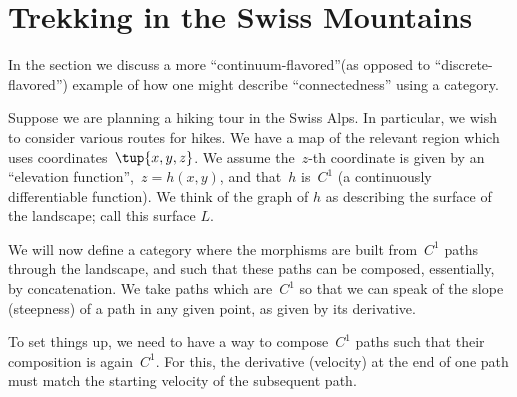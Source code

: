 
\section{Trekking in the Swiss Mountains}
\label{sec:trekking}

In the section we discuss a more ``continuum-flavored''(as opposed to ``discrete-flavored'') example of how one might describe ``connectedness'' using a category.

Suppose we are planning a hiking tour in the Swiss Alps.
In particular, we wish to consider various routes for hikes.
We have a map of the relevant region which uses coordinates~$\tup{x,y,z}$.
We assume the~$z$-th coordinate is given by an ``elevation function'',~$z = h(x,y)$, and that~$h$ is~$C^1$ (a continuously differentiable function).
We think of the graph of $h$ as describing the surface of the landscape; call this surface $L$.

We will now define a category where the morphisms are built from~$C^1$ paths through the landscape, and such that these paths can be composed, essentially, by concatenation.
We take paths which are~$C^1$ so that we can speak of the slope (steepness) of a path in any given point, as given by its derivative.

To set things up, we need to have a way to compose~$C^1$ paths such that their composition is again~$C^1$.
For this, the derivative (velocity) at the end of one path must match the starting velocity of the subsequent path.

